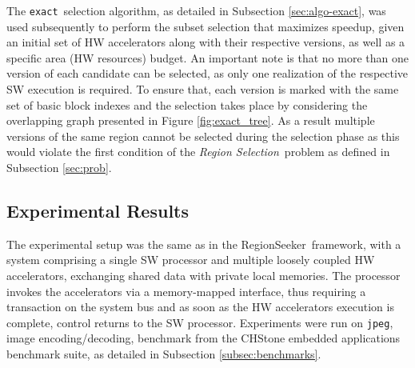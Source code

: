 \documentclass[]{usiinfthesis}
\newcommand{\rseeker}{{RegionSeeker}}
\newcommand{\multi}{MuLTiVersioning}
\newcommand{\plms}{{private local memories}}
\newcommand{\exact}{\texttt{exact}}
\newcommand{\jpeg}{\texttt{jpeg}}
\newcommand{\rsprobname}{\emph{Region Selection}}
\begin{document}
The \exact\ selection algorithm, as detailed in Subsection \ref{sec:algo-exact}, was used subsequently 
to perform the subset selection that maximizes speedup, 
given an initial set of HW accelerators along with their respective versions, as well as a specific 
area (HW resources) budget. An important note is that no more than one version of each candidate 
can be selected, as only one realization of the respective SW execution is required.
To ensure that, each version is marked with the same set of basic block indexes and the selection
takes place by considering the overlapping graph presented in Figure \ref{fig:exact_tree}.
As a result multiple versions of the same region cannot be selected during the selection phase as this 
would violate the first condition of the \rsprobname\ problem as defined in Subsection \ref{sec:prob}.


\subsection{Experimental Results}
\label{subsec:mv_res}

The experimental setup was the same as in the \rseeker\ framework, with a system comprising a single 
SW processor and multiple loosely coupled HW accelerators, exchanging shared data with \plms.
The processor invokes the accelerators via a memory-mapped
interface, thus requiring a transaction on the system bus and as soon as the HW accelerators execution is complete, control returns to the SW processor.
Experiments were run on \jpeg, image encoding/decoding, benchmark from the CHStone embedded applications benchmark suite, as detailed in Subsection \ref{subsec:benchmarks}.\par
\end{document}
